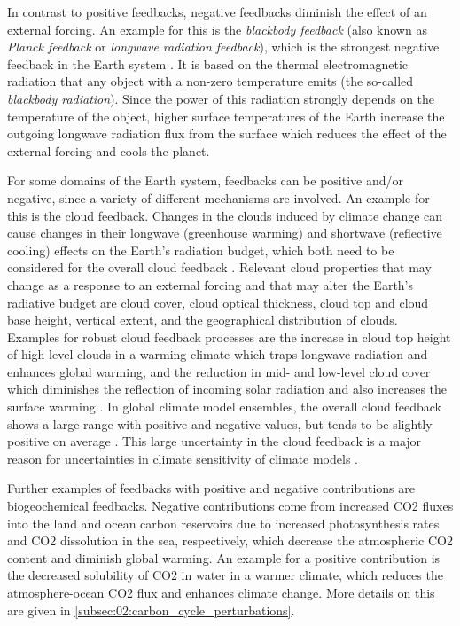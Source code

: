 In contrast to positive feedbacks, negative feedbacks diminish the effect of an
external forcing. An example for this is the \emph{blackbody feedback} (also
known as \emph{Planck feedback} or \emph{longwave radiation feedback}), which
is the strongest negative feedback in the Earth system \autocite{Cubasch2013}.
It is based on the thermal electromagnetic radiation that any object with a
non-zero temperature emits (the so-called \emph{blackbody radiation}). Since
the power of this radiation strongly depends on the temperature of the object,
higher surface temperatures of the Earth increase the outgoing longwave
radiation flux from the surface which reduces the effect of the external
forcing and cools the planet.

For some domains of the Earth system, feedbacks can be positive and/or
negative, since a variety of different mechanisms are involved. An example for
this is the cloud feedback. Changes in the clouds induced by climate change can
cause changes in their longwave (greenhouse warming) and shortwave (reflective
cooling) effects on the Earth's radiation budget, which both need to be
considered for the overall cloud feedback \autocite{Boucher2013}. Relevant
cloud properties that may change as a response to an external forcing and that
may alter the Earth's radiative budget are cloud cover, cloud optical
thickness, cloud top and cloud base height, vertical extent, and the
geographical distribution of clouds. Examples for robust cloud feedback
processes are the increase in cloud top height of high-level clouds in a
warming climate which traps longwave radiation and enhances global warming, and
the reduction in mid- and low-level cloud cover which diminishes the reflection
of incoming solar radiation and also increases the surface warming
\autocite{Boucher2013}. In global climate model ensembles, the overall cloud
feedback shows a large range with positive and negative values, but tends to be
slightly positive on average \autocite{Soden2006, Dufresne2008, Vial2013,
  Zelinka2020}. This large uncertainty in the cloud feedback is a major reason
for uncertainties in climate sensitivity of climate models
\autocite{Boucher2013, Flato2013}.

Further examples of feedbacks with positive and negative contributions are
biogeochemical feedbacks. Negative contributions come from increased \ac{CO2}
fluxes into the land and ocean carbon reservoirs due to increased
photosynthesis rates and \ac{CO2} dissolution in the sea, respectively, which
decrease the atmospheric \ac{CO2} content and diminish global warming. An
example for a positive contribution is the decreased solubility of \ac{CO2} in
water in a warmer climate, which reduces the atmosphere-ocean \ac{CO2} flux and
enhances climate change. More details on this are given in
\cref{subsec:02:carbon_cycle_perturbations}.


